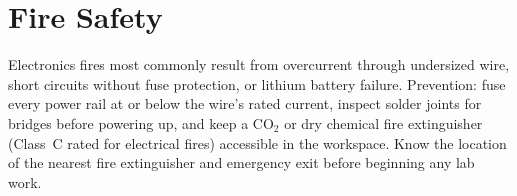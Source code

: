 \section*{Fire Safety}
Electronics fires most commonly result from overcurrent through undersized wire, short circuits without fuse protection, or lithium battery failure. Prevention: fuse every power rail at or below the wire's rated current, inspect solder joints for bridges before powering up, and keep a CO$_2$ or dry chemical fire extinguisher (Class~C rated for electrical fires) accessible in the workspace. Know the location of the nearest fire extinguisher and emergency exit before beginning any lab work.

\mainmatter


